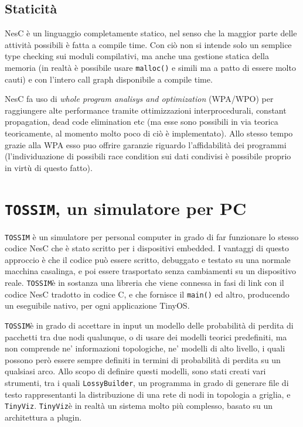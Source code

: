 \documentclass[pdftex,11pt,a4paper,italian,openany]{book}
\begin{document}
\subsection{Staticità}

NesC è un linguaggio completamente statico, nel senso che la maggior parte delle attività 
possibili è fatta a compile time. Con ciò non si intende solo un semplice type checking sui 
moduli compilativi, ma anche una gestione statica della memoria (in realtà è possibile usare 
\texttt{malloc()} e simili ma a patto di essere molto cauti) e con l'intero call graph disponibile a compile time. 

NesC fa uso di \emph{whole program analisys and optimization} (WPA/WPO) per raggiungere alte
performance tramite ottimizzazioni interprocedurali, constant propagation, dead code 
elimination etc (ma esse sono possibili in via teorica teoricamente, al momento molto poco 
di ciò è implementato).
Allo stesso tempo grazie alla WPA esso puo offrire garanzie riguardo l'affidabilità dei 
programmi (l'individuazione di possibili race condition sui dati condivisi è possibile proprio 
in virtù di questo fatto).


\newcommand{\tos}{\texttt{TOSSIM}}

\section{\tos, un simulatore per PC}
\tos\cite{TOSSIM} è un simulatore per personal computer  in grado di far funzionare lo 
stesso codice NesC che è stato scritto per i dispositivi embedded. 
I vantaggi di questo approccio è che il codice può essere scritto, debuggato e testato su 
una normale macchina casalinga, e poi essere trasportato senza cambiamenti su un dispositivo 
reale. 
\tos è in sostanza una libreria che viene connessa in fasi di link con il codice NesC 
tradotto in codice C, e che fornisce il \texttt{main()} ed altro, producendo un 
eseguibile nativo, per ogni applicazione TinyOS.

\tos è in grado di accettare in input un modello delle probabilità di perdita di pacchetti 
tra due nodi qualunque, o di usare dei modelli teorici predefiniti, ma non comprende ne' 
informazioni topologiche, ne' modelli di alto livello, i quali possono però essere sempre 
definiti in termini di probabilità di perdita su un qualsiasi arco.
\newcommand{\tv}{\texttt{TinyViz}}
Allo scopo di definire questi modelli, sono stati creati vari strumenti, tra i quali 
\texttt{LossyBuilder}, un programma in grado di generare file di testo rappresentanti 
la distribuzione di una rete di nodi in topologia a griglia, e \tv.
\tv è in realtà un sistema molto più complesso, basato su un architettura a plugin. 
\end{document}
